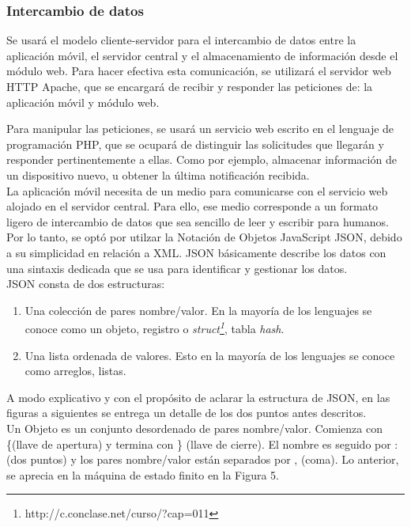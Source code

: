 \subsubsection{Intercambio de datos}

Se usará el modelo cliente-servidor para el intercambio de datos entre la aplicación móvil, el servidor central y el almacenamiento de información desde el módulo web. Para hacer efectiva esta comunicación, se utilizará el servidor web HTTP Apache, que se encargará de recibir y responder las peticiones de: la aplicación móvil y módulo web.

Para manipular las peticiones, se usará un servicio web escrito en el lenguaje de programación PHP, que se ocupará de distinguir las solicitudes que llegarán y responder pertinentemente a ellas. Como por ejemplo, almacenar información de un dispositivo nuevo, u obtener la última notificación recibida.\\

La aplicación móvil necesita de un medio para comunicarse con el servicio web alojado en el servidor central. Para ello, ese medio corresponde a un formato ligero de intercambio de datos que sea sencillo de leer y escribir para humanos. Por lo tanto, se optó por utilzar la Notación de Objetos JavaScript JSON, debido a su simplicidad en relación a XML. JSON básicamente describe los datos con una sintaxis dedicada que se usa para identificar y gestionar los datos.\\

JSON consta de dos estructuras:

\begin{enumerate}
\item Una colección de pares nombre/valor. En la mayoría de los lenguajes se conoce como un objeto, registro o \textit{struct\footnote{http://c.conclase.net/curso/?cap=011}}, tabla \textit{hash}.
\item Una lista ordenada de valores. Esto en la mayoría de los lenguajes se conoce como arreglos, listas.
\end{enumerate}

A modo explicativo y con el propósito de aclarar la estructura de JSON, en las figuras a siguientes se entrega un detalle de los dos puntos antes descritos.\\

Un Objeto es un conjunto desordenado de pares nombre/valor. Comienza con \{(llave de apertura) y termina con \} (llave de cierre). El nombre es seguido por : (dos puntos) y los pares nombre/valor están separados por , (coma). Lo anterior, se aprecia en la máquina de estado finito en la Figura 5.\\

